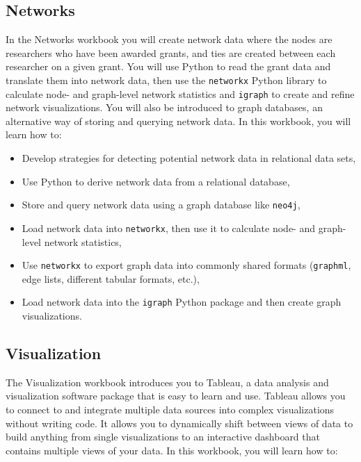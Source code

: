\documentclass[]{krantz}
\begin{document}
\subsection{Networks}\label{networks}

In the Networks workbook you will create network data where the nodes
are researchers who have been awarded grants, and ties are created
between each researcher on a given grant. You will use Python to read
the grant data and translate them into network data, then use the
\texttt{networkx} Python library to calculate node- and graph-level
network statistics and \texttt{igraph} to create and refine network
visualizations. You will also be introduced to graph databases, an
alternative way of storing and querying network data. In this workbook,
you will learn how to:

\begin{itemize}
\item
  Develop strategies for detecting potential network data in relational
  data sets,
\item
  Use Python to derive network data from a relational database,
\item
  Store and query network data using a graph database like
  \texttt{neo4j},
\item
  Load network data into \texttt{networkx}, then use it to calculate
  node- and graph-level network statistics,
\item
  Use \texttt{networkx} to export graph data into commonly shared
  formats (\texttt{graphml}, edge lists, different tabular formats,
  etc.),
\item
  Load network data into the \texttt{igraph} Python package and then
  create graph visualizations.
\end{itemize}

\subsection{Visualization}\label{visualization}

The Visualization workbook introduces you to Tableau, a data analysis
and visualization software package that is easy to learn and use.
Tableau allows you to connect to and integrate multiple data sources
into complex visualizations without writing code. It allows you to
dynamically shift between views of data to build anything from single
visualizations to an interactive dashboard that contains multiple views
of your data. In this workbook, you will learn how to:
\end{document}
